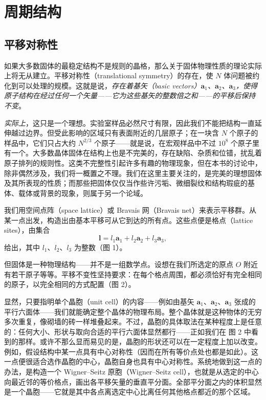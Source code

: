 
\chapter{周期结构}


\section{平移对称性}

如果大多数固体的最稳定结构不是规则的晶格，那么关于固体物理性质的理论实际上将无从建立。平移对称性（translational symmetry）的存在，使 $N$ 体问题被约化到可以处理的规模。这就是说，\emph{存在着基矢（basic vectors）$\mathbf{a}_1$、$\mathbf{a}_2$、$\mathbf{a}_3$，使得原子结构在经过任何一个矢量——它为这些基矢的整数倍之和——的平移后保持不变}。

\emph{实际上}，这只是一个理想。实验室样品必然尺寸有限，因此我们不能把结构一直延伸越过边界。但受此影响的区域只有表面附近的几层原子；在一块含 $N$ 个原子的样品中，它们只占大约 $N^{2/3}$ 个原子——就是说，在宏观样品中不过 $10^{8}$ 个原子里有一个。大多数晶体固体在结构上也是不完美的，存在缺陷、杂质和位错，扰乱着原子排列的规则性。这类不完整性引起许多有趣的物理现象，但在本书的讨论中，除非偶然涉及，我们将一概置之不理。我们在这里主要关注的，是完美的理想固体及其所表现的性质；而那些把固体仅仅当作些许污垢、微细裂纹和结构瑕疵的基体、载体或背景的现象，则属于另一个论域。

我们用空间点阵（space lattice）或 Bravais 网（Bravais net）来表示平移群。从某一点出发，构造出由基本平移可从它到达的所有点。这些点便是格点（lattice sites），由集合
\begin{equation*}
\boldsymbol{l} = l_1\mathbf{a}_1 + l_2\mathbf{a}_2 + l_3\mathbf{a}_3,
\tag{1.1}
\end{equation*}
给出，其中 $l_1$、$l_2$、$l_3$ 为整数（图 1）。

但固体是一种物理结构——并不是一组数学点。设想在我们所选定的原点 $O$ 附近有若干原子等等。平移不变性坚持要求：在每个格点周围，都必须恰好有完全相同的原子，以完全相同的方式配置（图 2）。

显然，只要指明单个晶胞（unit cell）的内容——例如由基矢 $\mathbf{a}_1$、$\mathbf{a}_2$、$\mathbf{a}_3$ 张成的平行六面体——我们就能确定整个晶体的物理布局。整个晶体就是这种物体的无穷多次重复，像砌墙的砖一样堆叠起来。不过，晶胞的具体取法在某种程度上是任意的：任何大小、形状与取向合适的平行六面体显然都行——正如我们在
图 2 中看到的那样。或许不那么显而易见的是，晶胞的形状还可以在一定程度上加以改变。例如，假设结构中某一点具有中心对称性（因而在所有等价点处也都是如此）。这一点便很适合选作晶胞的中心，晶胞自身也具有中心对称性。系统地做到这一点的办法，是构造一个 Wigner–Seitz 原胞（Wigner–Seitz cell），也就是从选定的中心向最近邻的等价格点，画出各平移矢量的垂直平分面。全部平分面之内的体积显然是一个晶胞——它就是其中各点离选定中心比离任何其他格点都近的那个区域。

